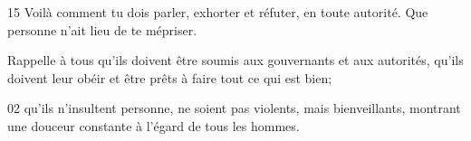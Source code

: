 15 Voilà comment tu dois parler, exhorter et réfuter, en toute autorité. Que personne n’ait lieu de te mépriser.

Rappelle à tous qu’ils doivent être soumis aux gouvernants et aux autorités, qu’ils doivent leur obéir et être prêts à faire tout ce qui est bien;

02 qu’ils n’insultent personne, ne soient pas violents, mais bienveillants, montrant une douceur constante à l’égard de tous les hommes.
